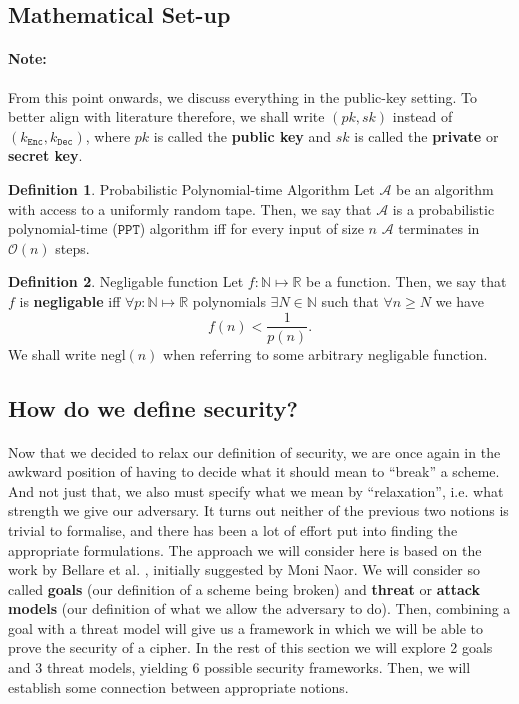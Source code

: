\documentclass{article}
\theoremstyle{definition}
\newtheorem{definition}{Definition}[section]
\newcommand{\Enc}{\texttt{Enc}}
\newcommand{\Dec}{\texttt{Dec}}
\newcommand{\A}{\mathcal{A}}
\newcommand{\Oh}{\mathcal{O}}
\newcommand{\Nat}{\mathbb{N}}
\newcommand{\Reals}{\mathbb{R}}
\newcommand{\PPT}{\texttt{PPT}}
\newcommand{\negl}{\text{negl}}
\begin{document}
\subsection{Mathematical Set-up}
\paragraph{Note:} From this point onwards, we discuss everything in the
public-key setting. To better align with literature therefore, we shall write
$(pk, sk)$ instead of $(k_\Enc, k_\Dec)$, where $pk$ is called the \textbf{public key}
and $sk$ is called the \textbf{private} or \textbf{secret key}.
\begin{definition}{Probabilistic Polynomial-time Algorithm}
 Let $\A$ be an algorithm with access to a uniformly random tape. Then, we say that $\A$
 is a probabilistic polynomial-time ($\PPT$) algorithm iff for every input of size
 $n$ $\A$ terminates in $\Oh(n)$ steps. 
\end{definition}
\begin{definition}{Negligable function}
  Let $f: \Nat \mapsto \Reals$ be a function. Then, we say that $f$ is
  \textbf{negligable} iff $\forall p: \Nat \mapsto \Reals$ polynomials $\exists
  N \in \Nat$ such that $\forall n \geq N$ we have
  \[
    f(n) < \frac{1}{p(n)}. 
  \]
  We shall write $\negl(n)$ when referring to some arbitrary negligable function.
\end{definition}
\subsection{How do we define security?}
\paragraph{} Now that we decided to relax our definition of security, we are
once again in the awkward position of having to decide what it should mean to
``break'' a scheme. And not just that, we also must specify what we mean by
``relaxation'', i.e. what strength we give our adversary. It turns out neither
of the previous two notions is trivial to formalise, and there has been a lot of
effort put into finding the appropriate formulations. The approach we will consider here is based on the work by Bellare
et al. \cite{bellaresecurityrelations}, initially suggested by Moni
Naor\footnotemark. We will consider so
called \textbf{goals} (our definition of a scheme being broken) and \textbf{threat} or
\textbf{attack models} (our definition of what we allow the adversary to do).
Then, combining a goal with a threat model will give us a framework in which we
will be able to prove the security of a cipher. In the rest of this section we
will explore 2 goals and 3 threat models, yielding 6 possible security
frameworks. Then, we will establish some connection between appropriate notions.
\end{document}
